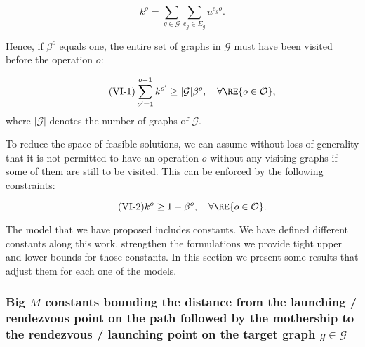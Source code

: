 $$k^o=\sum_{g\in\mathcal G}\sum_{e_g\in E_g} u^{e_go}.$$

\noindent
Hence, if $\beta^o$ equals one, the entire set of graphs in $\mathcal G$ must have been visited before the operation $o$:

\begin{equation}\tag{VI-1}\label{eq:VI-1}
\sum_{o'=1}^{o-1} k^{o'} \geq |\mathcal G|\beta^o, \quad\forall \RE{o\in\mathcal{O}},
\end{equation}
where $|\mathcal G|$ denotes the number of graphs of $\mathcal G$.

\noindent
To reduce the space of feasible solutions, we can assume without loss of generality that it is not permitted to have an operation $o$ without any visiting graphs if some of them are still to be visited. This can be enforced by the following constraints:

\begin{equation}\tag{VI-2}\label{eq:VI-2}
k^o \geq 1 - \beta^o, \quad\forall \RE{o\in\mathcal{O}}.
\end{equation}

\noindent
The model that we have proposed includes  constants. We have defined different  constants along this work.  strengthen the formulations\RE{,} we provide tight upper and lower bounds for those constants. In this section\RE{,} we present some results that adjust them for each one of the models. 


\subsubsection*{Big $M$ constants bounding the distance from the launching / rendezvous point on the path followed by the mothership to the rendezvous / launching point on the target graph $g\in \mathcal{G}$}


